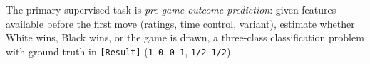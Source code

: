 The primary supervised task is \emph{pre-game outcome prediction}: given features available before the first move (ratings, time control, variant), estimate whether White wins, Black wins, or the game is drawn, a three-class classification problem with ground truth in \texttt{[Result]} (\texttt{1-0}, \texttt{0-1}, \texttt{1/2-1/2}).

